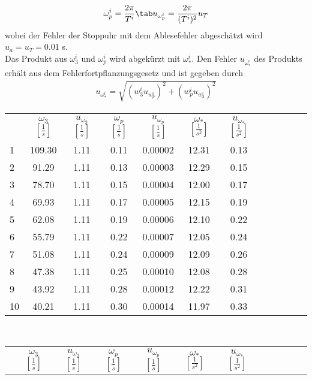 \begin{gather}
    \omega_p^i=\frac{2\pi}{T^i}\tab u_{\omega_p^i}=\frac{2\pi}{(T^i)^2}u_T
\end{gather}
wobei der Fehler der Stoppuhr mit dem Ablesefehler abgeschätzt wird $u_a=u_T=0.01$ s.\\
Das Produkt aus $\omega_3^i$ und $\omega_p^i$ wird abgekürzt mit $\omega_*^i$. Den Fehler $u_{\omega_*^i}$ des Produkts erhält aus dem Fehlerfortpflanzungsgesetz und ist gegeben durch
\begin{align}
    u_{\omega_\ast^i}=\sqrt{(w_3^i u_{w_p^i})^2+(w_p^i u_{w_3^i})^2}
\end{align}
\begin{center}
    \begin{tabular}{gccccccccccc}
         &      $\omega_3$ $[\frac{1}{s}]$ &  $u_{\omega_3}$ $[\frac{1}{s}]$ &    $\omega_p$ $[\frac{1}{s}]$ &     $u_{\omega_p}$ $[\frac{1}{s}]$ &     $\omega_*$ $[\frac{1}{s^2}]$&  $u_{\omega_*}$ $[\frac{1}{s^2}]$\\
        1  &  109.30 &  1.11 &  0.11 &  0.00002 &  12.31 &  0.13 \\
        2  &   91.29 &  1.11 &  0.13 &  0.00003 &  12.29 &  0.15 \\
        3  &   78.70 &  1.11 &  0.15 &  0.00004 &  12.00 &  0.17 \\
        4  &   69.93 &  1.11 &  0.17 &  0.00005 &  12.15 &  0.19 \\
        5  &   62.08 &  1.11 &  0.19 &  0.00006 &  12.10 &  0.22 \\
        6  &   55.79 &  1.11 &  0.22 &  0.00007 &  12.05 &  0.24 \\
        7  &   51.08 &  1.11 &  0.24 &  0.00009 &  12.09 &  0.26 \\
        8  &   47.38 &  1.11 &  0.25 &  0.00010 &  12.08 &  0.28 \\
        9  &   43.92 &  1.11 &  0.28 &  0.00012 &  12.22 &  0.31 \\
        10 &   40.21 &  1.11 &  0.30 &  0.00014 &  11.97 &  0.33 \\
    \end{tabular}\\
    \begin{tabular}{gccccccccccc}
         &      $\omega_3$ $[\frac{1}{s}]$ &  $u_{\omega_3}$ $[\frac{1}{s}]$ &    $\omega_p$ $[\frac{1}{s}]$ &     $u_{\omega_p}$ $[\frac{1}{s}]$ &     $\omega_*$ $[\frac{1}{s^2}]$&  $u_{\omega_*}$ $[\frac{1}{s^2}]$\\

\end{tabular}
\end{center}
